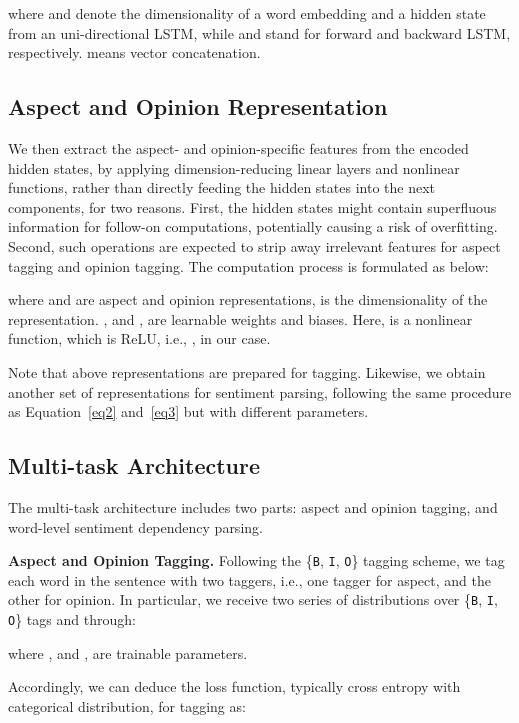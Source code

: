 \documentclass[11pt,a4paper]{article}
\begin{document}
where  and  denote the dimensionality of a word embedding and a hidden state from an uni-directional LSTM, while  and  stand for forward and backward LSTM, respectively.  means vector concatenation. 

\subsection{Aspect and Opinion Representation}

We then extract the aspect- and opinion-specific features from the encoded hidden states, by applying dimension-reducing linear layers and nonlinear functions, rather than directly feeding the hidden states into the next components, for two reasons. First, the hidden states might contain superfluous information for follow-on computations, potentially causing a risk of overfitting. Second, such operations are expected to strip away irrelevant features for aspect tagging and opinion tagging. The computation process is formulated as below:

where  and  are aspect and opinion representations,  is the dimensionality of the representation. ,  and ,  are learnable weights and biases. Here,  is a nonlinear function, which is ReLU, i.e., , in our case.

Note that above representations are prepared for tagging. Likewise, we obtain another set of representations  for sentiment parsing, following the same procedure as Equation~\ref{eq2} and~\ref{eq3} but with different parameters.

\subsection{Multi-task Architecture}

The multi-task architecture includes two parts: aspect and opinion tagging, and word-level sentiment dependency parsing. 

\noindent \textbf{Aspect and Opinion Tagging.} Following the \{\texttt{B}, \texttt{I}, \texttt{O}\} tagging scheme, we tag each word in the sentence with two taggers, i.e., one tagger for aspect, and the other for opinion. In particular, we receive two series of distributions over \{\texttt{B}, \texttt{I}, \texttt{O}\} tags  and  through:

where ,  and ,  are trainable parameters.

Accordingly, we can deduce the loss function, typically cross entropy with categorical distribution, for tagging as:
\end{document}
